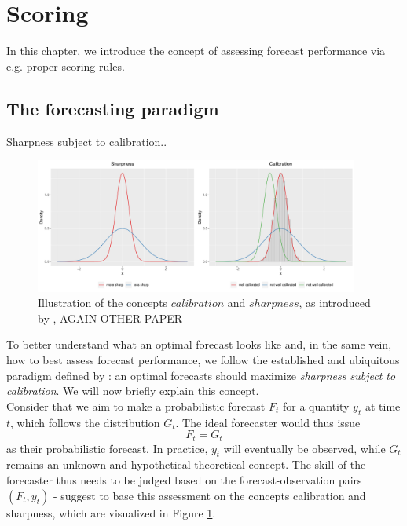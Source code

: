 \section{Scoring}
In this chapter, we introduce the concept of assessing forecast performance via e.g. proper scoring rules.
\subsection{The forecasting paradigm}
Sharpness subject to calibration.\cite{ray_ensemble_2020}.
\begin{figure}
\centering
\includegraphics[width = 0.95\textwidth]{../plots/sharp_calib.pdf}
\caption{Illustration of the concepts $calibration$ and $sharpness$, as introduced by \cite{gneiting_strictly_2007}, AGAIN OTHER PAPER}
\label{fig:sharpcalib}
\end{figure}
To better understand what an optimal forecast looks like and, in the same vein, how to best assess forecast performance, we follow the established and ubiquitous paradigm defined by \cite{gneiting_probabilistic_2007}: an optimal forecasts should maximize \textit{sharpness subject to calibration}. We will now briefly explain this concept.\\
Consider that we aim to make a probabilistic forecast $F_t$ for a quantity $y_t$ at time $t$, which follows the distribution $G_t$. The ideal forecaster would thus issue 
\begin{equation}
	F_t = G_t
\end{equation}
as their probabilistic forecast. In practice, $y_t$ will eventually be observed, while $G_t$ remains an unknown and hypothetical theoretical concept. The skill of the forecaster thus needs to be judged based on the forecast-observation pairs $(F_t, y_t)$ - \cite{gneiting_probabilistic_2007} suggest to base this assessment on the concepts calibration and sharpness, which are visualized in Figure \ref{fig:sharpcalib}. \\
